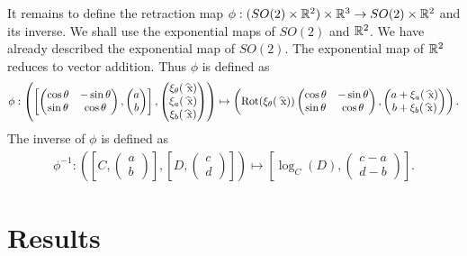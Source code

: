 \documentclass[12pt]{article}
\begin{document}
It remains to define the retraction map $ \phi: (SO(2) \times \mathbb{R}^2) \times \mathbb{R}^3 \to SO(2) \times \mathbb{R}^2$ and its inverse. We shall use the exponential maps of $ SO(2)$ and $ \mathbb{R}^2$. We have already described the exponential map of $ SO(2)$. The exponential map of $ \mathbb{R}^2$ reduces to vector addition. Thus $ \phi$ is defined as
\begin{align}
	\phi : \left( \left[\begin{pmatrix} \cos \theta &-\sin \theta\\ \sin \theta &\cos \theta \end{pmatrix}, \begin{pmatrix} a\\b \end{pmatrix} \right], \begin{pmatrix} \xi_\theta( \wh{ x}) \\ \xi_a( \wh{ x})\\ \xi_b( \wh{ x}) \end{pmatrix}  \right) \mapsto \left( \Rot( \xi_\theta( \wh{ x})) \begin{pmatrix} \cos \theta &-\sin \theta\\ \sin \theta &\cos \theta \end{pmatrix}, \begin{pmatrix} a+ \xi_a( \wh{ x})\\ b+ \xi_{b}( \wh{ x}) \end{pmatrix}  \right)  .
\end{align}
The inverse of $ \phi$ is defined as
\begin{align}
	\phi^{-1}: \left( \left[   C, \begin{pmatrix} a\\b \end{pmatrix}  \right], \left[ D, \begin{pmatrix} c\\d \end{pmatrix}  \right]   \right) \mapsto \left[ \log_C(D), \begin{pmatrix} c-a\\d-b \end{pmatrix}  \right] .
\end{align}


\section{Results}
\end{document}
